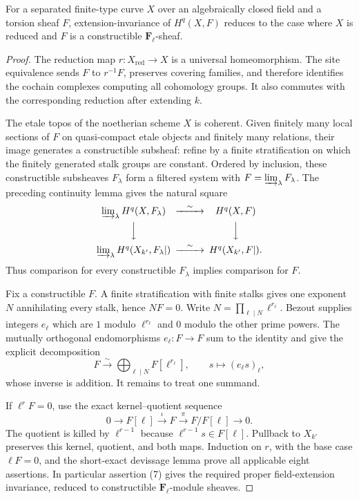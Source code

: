 \begin{lemma}
\label{lemma:weil-pbc-curve-constructible-primary-reduction}
\uses{}

For a separated finite-type curve $X$ over an algebraically closed field and
a torsion sheaf $F$, extension-invariance of $H^q(X,F)$ reduces to the case
where $X$ is reduced and $F$ is a constructible $\mathbf F_\ell$-sheaf.
\end{lemma}
\begin{proof}

The reduction map $r:X_{\mathrm{red}}\to X$ is a universal homeomorphism.
The site equivalence sends $F$ to $r^{-1}F$, preserves covering families, and
therefore identifies the cochain complexes computing all cohomology groups.
It also commutes with the corresponding reduction after extending $k$.

The etale topos of the noetherian scheme $X$ is coherent.  Given finitely
many local sections of $F$ on quasi-compact etale objects and finitely many
relations, their image generates a constructible subsheaf: refine by a
finite stratification on which the finitely generated stalk groups are
constant.  Ordered by inclusion, these constructible subsheaves $F_\lambda$
form a filtered system with $F=\varinjlim_\lambda F_\lambda$.  The preceding
continuity lemma gives the natural square
\[
\begin{CD}
 \varinjlim_\lambda H^q(X,F_\lambda) @>{\sim}>> H^q(X,F)\\
 @VVV @VVV\\
 \varinjlim_\lambda H^q(X_{k'},F_\lambda|) @>{\sim}>>
 H^q(X_{k'},F|).
\end{CD}
\]
Thus comparison for every constructible $F_\lambda$ implies comparison for
$F$.

Fix a constructible $F$.  A finite stratification with finite stalks gives
one exponent $N$ annihilating every stalk, hence $NF=0$.  Write
$N=\prod_{\ell\mid N}\ell^{r_\ell}$.  Bezout supplies integers
$e_\ell$ which are $1$ modulo $\ell^{r_\ell}$ and $0$ modulo the other prime
powers.  The mutually orthogonal endomorphisms $e_\ell:F\to F$ sum to the
identity and give the explicit decomposition
\[
 F\xrightarrow{\sim}\bigoplus_{\ell\mid N}F[\ell^{r_\ell}],
 \qquad s\longmapsto(e_\ell s)_\ell,
\]
whose inverse is addition.  It remains to treat one summand.

If $\ell^rF=0$, use the exact kernel--quotient sequence
\[
 0\longrightarrow F[\ell]\xrightarrow{\iota}F
 \xrightarrow{\pi}F/F[\ell]\longrightarrow0.
\]
The quotient is killed by $\ell^{r-1}$ because
$\ell^{r-1}s\in F[\ell]$.  Pullback to $X_{k'}$ preserves this kernel,
quotient, and both maps.  Induction on $r$, with the base case
$\ell F=0$, and the short-exact devissage lemma prove all applicable eight
assertions.  In particular assertion (7) gives the required proper
field-extension invariance, reduced to constructible
$\mathbf F_\ell$-module sheaves.
\end{proof}

